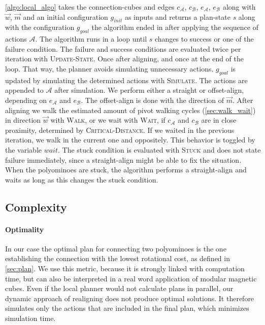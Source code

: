 \autoref{algo:local_algo} takes the connection-cubes and edges $c_\mathcal{A}$, $c_\mathcal{B}$, $e_\mathcal{A}$, $e_\mathcal{B}$ along with $\vec{w}$, $\vec{m}$ and an initial configuration $g_{init}$ as inputs and returns a plan-state $s$ along with the configuration $g_{goal}$ the algorithm ended in after applying the sequence of actions $\mathcal{A}$.
The algorithm runs in a loop until $s$ changes to success or one of the failure condition.
The failure and success conditions are evaluated twice per iteration with {\scshape Update-State}.
Once after aligning, and once at the end of the loop.
That way, the planner avoids simulating unnecessary actions.
$g_{goal}$ is updated by simulating the determined actions with {\scshape Simulate}.
The actions are appended to $\mathcal{A}$ after simulation.
We perform either a straight or offset-align, depending on $e_\mathcal{A}$ and $e_\mathcal{B}$.
The offset-align is done with the direction of $\vec{m}$.
After aligning we walk the estimated amount of pivot walking cycles (\autoref{sec:walk_wait}) in direction $\vec{w}$ with {\scshape Walk}, or we wait with {\scshape Wait}, if $c_\mathcal{A}$ and $c_\mathcal{B}$ are in close proximity, determined by {\scshape Critical-Distance}.
If we waited in the previous iteration, we walk in the current one and oppositely.
This behavior is toggled by the variable $wait$. 
The stuck condition is evaluated with {\scshape Stuck} and does not state failure immediately, since a straight-align might be able to fix the situation.
When the polyominoes are stuck, the algorithm performs a straight-align and waits as long as this changes the stuck condition.

\subsection{Complexity}
\label{sec:local_complex}

\paragraph{Optimality}

In our case the optimal plan for connecting two polyominoes is the one establishing the connection with the lowest rotational cost, as defined in \autoref{sec:plan}.
We use this metric, because it is strongly linked with computation time, but can also be interpreted in a real word application of modular magnetic cubes.
Even if the local planner would not calculate plans in parallel, our dynamic approach of realigning does not produce optimal solutions.
It therefore simulates only the actions that are included in the final plan, which minimizes simulation time.


